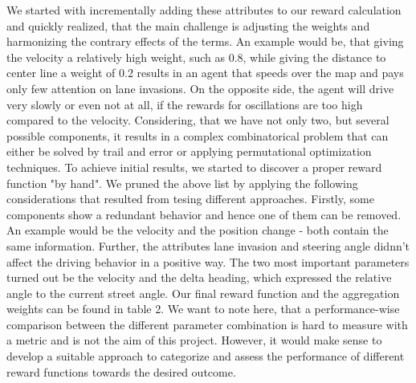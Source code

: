 \documentclass[letterpaper, 10 pt, conference]{ieeeconf}  %
\begin{document}
We started with incrementally adding these attributes to our reward calculation and quickly realized, that the main challenge is adjusting the weights and harmonizing the contrary effects of the terms.
An example would be, that giving the velocity a relatively high weight, such as 0.8, while giving the distance to center line a weight of 0.2 results in an agent that speeds over the map and pays only few attention on lane invasions. On the opposite side, the agent will drive very slowly or even not at all, if the rewards for oscillations are too high compared to the velocity. Considering, that we have not only two, but several possible components, it results in a complex combinatorical problem that can either be solved by trail and error or applying permutational optimization techniques. To achieve initial results, we started to discover a proper reward function "by hand". 
\newline
We pruned the above list by applying the following considerations that resulted from tesing different approaches. Firstly, some components show a redundant behavior and hence one of them can be removed. An example would be the velocity and the position change - both contain the same information. Further, the attributes lane invasion and steering angle didnn't affect the driving behavior in a positive way. The two most important parameters turned out be the velocity and the delta heading, which expressed the relative angle to the current street angle. Our final reward function and the aggregation weights can be found in table 2.
\newline
We want to note here, that a performance-wise comparison between the different parameter combination is hard to measure with a metric and is not the aim of this project. However, it would make sense to develop a suitable approach to categorize and assess the performance of different reward functions towards the desired outcome. 
\end{document}
